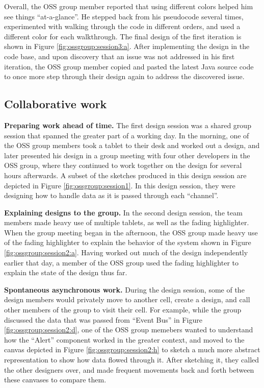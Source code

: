 \documentclass[12pt,fleqn]{ucithesis}
\begin{document}
Overall, the OSS group member reported that using different colors helped him see things ``at-a-glance''. He stepped back from his pseudocode several times, experimented with walking through the code in different orders, and used a different color for each walkthrough. The final design of the first iteration is shown in Figure \ref{fig:ossgroup:session3:a}. After implementing the design in the code base, and upon discovery that an issue was not addressed in his first iteration, the OSS group member copied and pasted the latest Java source code to once more step through their design again to address the discovered issue.

\subsection{Collaborative work}

\textbf{Preparing work ahead of time.} The first design session was a shared group session that spanned the greater part of a working day. In the morning, one of the OSS group members took a tablet to their desk and worked out a design, and later presented his design in a group meeting with four other developers in the OSS group, where they continued to work together on the design for several hours afterwards. A subset of the sketches produced in this design session are depicted in Figure \ref{fig:ossgroup:session1}. In this design session, they were designing how to handle data as it is passed through each ``channel''.

\textbf{Explaining designs to the group.} In the second design session, the team members made heavy use of multiple tablets, as well as the fading highlighter. When the group meeting began in the afternoon, the OSS group made heavy use of the fading highlighter to explain the behavior of the system shown in Figure \ref{fig:ossgroup:session2:a}. Having worked out much of the design independently earlier that day, a member of the OSS group used the fading highlighter to explain the state of the design thus far. 

\textbf{Spontaneous asynchronous work.} During the design session, some of the design members would privately move to another cell, create a design, and call other members of the group to visit their cell. For example, while the group discussed the data that was passed from ``Event Bus'' in Figure \ref{fig:ossgroup:session2:d}, one of the OSS group memebers wanted to understand how the ``Alert'' component worked in the greater context, and moved to the canvas depicted in Figure \ref{fig:ossgroup:session2:h} to sketch a much more abstract representation to show how data flowed through it. After sketching it, they called the other designers over, and made frequent movements back and forth between these canvases to compare them.
\end{document}
